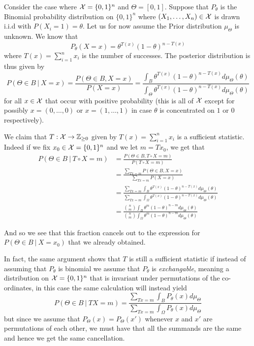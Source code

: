 \documentclass[twoside, a4paper, 10pt]{amsart}
\begin{document}
\begin{eg} \label{eg: bernoulli bayes setup} Consider the case where $\mathcal{X} = \{0,1\}^n$ and $\Theta = [0,1]$. Suppose that $P_{\theta}$ is the Binomial probability distribution on $\{0,1\}^n$ where $(X_1, \ldots, X_n) \in \mathcal{X}$ is drawn i.i.d with $P(X_i = 1) = \theta.$ Let us for now assume the Prior distribution $\mu_{\Theta}$ is unknown. We know that $$P_{\theta}(X = x) =   \theta^{T(x)}(1-\theta)^{n - T(x)} $$ where $T(x) = \sum_{i=1}^n x_i$ is the number of successes. The posterior distribution is thus given by $$P(\Theta \in B ~|~ X=x) = \frac{P(\Theta \in B, X=x)}{P(X=x)} = \frac{ \int_B \theta^{T(x)}(1-\theta)^{n - T(x)} d \mu_{\Theta}(\theta)}{\int_{\Theta} \theta^{T(x)}(1-\theta)^{n - T(x)} d \mu_{\Theta}(\theta)}$$ for all $x \in \mathcal{X}$ that occur with positive probability (this is all of $\mathcal{X}$ except for possibly $x = (0,\ldots, 0)$ or $x = (1, \ldots, 1)$ in case $\theta$ is concentrated on $1$ or $0$ respectively).


We claim that $ T:\mathcal{X} \to \mathbb{Z}_{\geq 0}$ given by $T(x) = \sum_{i=1}^n x_i$ is a sufficient statistic. Indeed if we fix $x_0 \in \mathcal{X} = \{0,1\}^n$ and we let $m=Tx_0$, we get that  
\begin{align*} P( \Theta \in B ~|~ T \circ X = m) &= \frac{P( \Theta \in B, T\circ X = m)}{P(T\circ X = m)} 
\\ &= \frac{\sum_{Tx = m} P(\Theta \in B, X = x) }{\sum_{Tx = m}P(X = x)} 
\\ &= \frac{ \sum_{Tx = m} \int_B \theta^{T(x)}(1-\theta)^{n - T(x)} d \mu_{\Theta}(\theta)}{ \sum_{Tx = m} \int_{\Omega} \theta^{T(x)}(1-\theta)^{n - T(x)} d \mu_{\Theta}(\theta)}
\\ &= \frac{ \binom{n}{m} \int_B \theta^{m}(1-\theta)^{n - m} d \mu_{\Theta}(\theta)}{ \binom{n}{m} \int_{\Omega} \theta^{m}(1-\theta)^{n - m} d \mu_{\Theta}(\theta)} \end{align*}

And so we see that this fraction cancels out to the expression for $P(\Theta \in B ~|~ X=x_0)$ that we already obtained.

In fact, the same argument shows that $T$ is still a sufficient statistic if instead of assuming that $P_{\theta}$ is binomial we assume that $P_{\theta}$ is \textit{exchangable}, meaning a distribution on $\mathcal{X} = \{0,1\}^n$ that is invariant under permutations of the co-ordinates, in this case the same calculation will instead yield $$P( \Theta \in B ~|~ TX = m) = \frac{\sum_{Tx = m} \int_B P_{\theta}(x) d\mu_{\Theta} }{\sum_{Tx = m}  \int_{\Omega} P_{\theta}(x) d\mu_{\Theta} }$$ but since we assume that $P_{\Theta}(x) = P_{\Theta}(x')$ whenever $x$ and $x'$ are permutations of each other, we must have that all the summands are the same and hence we get the same cancellation.
\end{eg}
\end{document}
